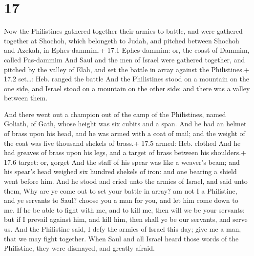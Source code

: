 \hypertarget{section-16}{%
\section{17}\label{section-16}}

 Now the Philistines gathered together their armies to
battle, and were gathered together at Shochoh, which belongeth to Judah,
and pitched between Shochoh and Azekah, in Ephes-dammim.+ 17.1
Ephes-dammim: or, the coast of Dammim, called Pas-dammim 
And Saul and the men of Israel were gathered together, and pitched by
the valley of Elah, and set the battle in array against the
Philistines.+ 17.2 set\ldots: Heb. ranged the battle  And
the Philistines stood on a mountain on the one side, and Israel stood on
a mountain on the other side: and there was a valley between them.

 And there went out a champion out of the camp of the
Philistines, named Goliath, of Gath, whose height was six cubits and a
span.  And he had an helmet of brass upon his head, and he
was armed with a coat of mail; and the weight of the coat was five
thousand shekels of brass.+ 17.5 armed: Heb. clothed  And he
had greaves of brass upon his legs, and a target of brass between his
shoulders.+ 17.6 target: or, gorget  And the staff of his
spear was like a weaver's beam; and his spear's head weighed six hundred
shekels of iron: and one bearing a shield went before him. 
And he stood and cried unto the armies of Israel, and said unto them,
Why are ye come out to set your battle in array? am not I a Philistine,
and ye servants to Saul? choose you a man for you, and let him come down
to me.  If he be able to fight with me, and to kill me, then
will we be your servants: but if I prevail against him, and kill him,
then shall ye be our servants, and serve us.  And the
Philistine said, I defy the armies of Israel this day; give me a man,
that we may fight together.  When Saul and all Israel heard
those words of the Philistine, they were dismayed, and greatly afraid.

